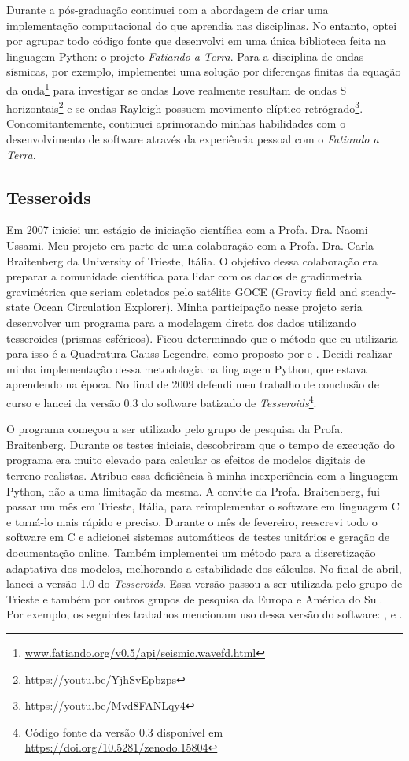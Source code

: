 Durante a pós-graduação continuei com a abordagem de criar uma implementação
computacional do que aprendia nas disciplinas.
No entanto, optei por agrupar todo código fonte que desenvolvi em uma única
biblioteca feita na linguagem Python: o projeto \textit{Fatiando a Terra}.
Para a disciplina de ondas sísmicas, por exemplo, implementei uma solução por
diferenças finitas da equação da
onda\footnote{\url{www.fatiando.org/v0.5/api/seismic.wavefd.html}} para
investigar se ondas Love realmente resultam de ondas S
horizontais\footnote{\url{https://youtu.be/YjhSvEpbzps}} e se ondas Rayleigh
possuem movimento elíptico
retrógrado\footnote{\url{https://youtu.be/Mvd8FANLqy4}}.
Concomitantemente, continuei aprimorando minhas habilidades com o
desenvolvimento de software através da experiência pessoal com o
\textit{Fatiando a Terra}.



\subsection{Tesseroids}

Em 2007 iniciei um estágio de iniciação científica com a Profa. Dra. Naomi
Ussami.
Meu projeto era parte de uma colaboração com a Profa. Dra. Carla Braitenberg da
University of Trieste, Itália.
O objetivo dessa colaboração era preparar a comunidade científica para lidar
com os dados de gradiometria gravimétrica que seriam coletados pelo satélite
GOCE (Gravity field and steady-state Ocean Circulation Explorer).
Minha participação nesse projeto seria desenvolver um programa para a modelagem
direta dos dados utilizando tesseroides (prismas esféricos).
Ficou determinado que o método que eu utilizaria para isso é a Quadratura
Gauss-Legendre, como proposto por \citet{asgharzadeh2007} e
\citet{wild-pfeiffer2008}.
Decidi realizar minha implementação dessa metodologia na linguagem Python, que
estava aprendendo na época.
No final de 2009 defendi meu trabalho de conclusão de curso e lancei da versão
0.3 do software batizado de \textit{Tesseroids}\footnote{Código fonte da versão
0.3 disponível em \url{https://doi.org/10.5281/zenodo.15804}}.

O programa começou a ser utilizado pelo grupo de pesquisa da Profa.
Braitenberg.
Durante os testes iniciais, descobriram que o tempo de execução do programa era
muito elevado para calcular os efeitos de modelos digitais de terreno
realistas.
Atribuo essa deficiência à minha inexperiência com a linguagem Python, não a
uma limitação da mesma.
A convite da Profa. Braitenberg, fui passar um mês em Trieste, Itália,
para reimplementar o software em linguagem C e torná-lo mais rápido e preciso.
Durante o mês de fevereiro, reescrevi todo o software em C e adicionei
sistemas automáticos de testes unitários e geração de documentação online.
Também implementei um método para a discretização adaptativa dos modelos,
melhorando a estabilidade dos cálculos.
No final de abril, lancei a versão 1.0 do \textit{Tesseroids}.
Essa versão passou a ser utilizada pelo grupo de Trieste e também por outros
grupos de pesquisa da Europa e América do Sul.
Por exemplo, os seguintes trabalhos mencionam uso dessa versão do software:
\citet{alvarez2012}, \citet{mariani2013} e \citet{bouman2013}.

